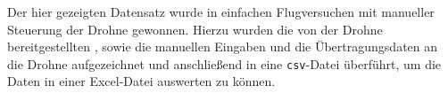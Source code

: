 
Der hier gezeigten Datensatz wurde in einfachen Flugversuchen mit manueller Steuerung der Drohne gewonnen. Hierzu wurden die von der Drohne bereitgestellten \Topic[s], sowie die manuellen Eingaben und die Übertragungsdaten an die Drohne aufgezeichnet und anschließend in eine \texttt{csv}-Datei überführt, um die Daten in einer Excel-Datei auswerten zu können.












































